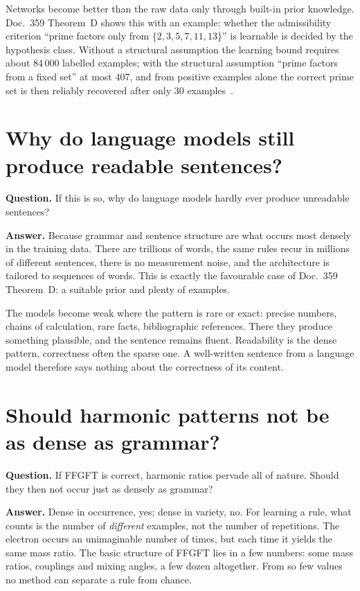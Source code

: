 Networks become better than the raw data only through built-in prior knowledge. Doc.~359 Theorem~D
shows this with an example: whether the admissibility criterion \enquote{prime factors only from
$\{2,3,5,7,11,13\}$} is learnable is decided by the hypothesis class. Without a structural assumption
the learning bound requires about 84\,000 labelled examples; with the structural assumption
\enquote{prime factors from a fixed set} at most 407, and from positive examples alone the correct
prime set is then reliably recovered after only 30 examples \KM\,\cite{ShalevShwartz2014}.

\section{Why do language models still produce readable sentences?}

\textbf{Question.} If this is so, why do language models hardly ever produce unreadable sentences?

\textbf{Answer.} Because grammar and sentence structure are what occurs most densely in the training
data. There are trillions of words, the same rules recur in millions of different sentences, there is
no measurement noise, and the architecture is tailored to sequences of words. This is exactly the
favourable case of Doc.~359 Theorem~D: a suitable prior and plenty of examples.

The models become weak where the pattern is rare or exact: precise numbers, chains of calculation,
rare facts, bibliographic references. There they produce something plausible, and the sentence
remains fluent. Readability is the dense pattern, correctness often the sparse one. A well-written
sentence from a language model therefore says nothing about the correctness of its content.

\section{Should harmonic patterns not be as dense as grammar?}

\textbf{Question.} If FFGFT is correct, harmonic ratios pervade all of nature. Should they then not
occur just as densely as grammar?

\textbf{Answer.} Dense in occurrence, yes; dense in variety, no. For learning a rule, what counts is
the number of \emph{different} examples, not the number of repetitions. The electron occurs an
unimaginable number of times, but each time it yields the same mass ratio. The basic structure of
FFGFT lies in a few numbers: some mass ratios, couplings and mixing angles, a few dozen altogether.
From so few values no method can separate a rule from chance.

